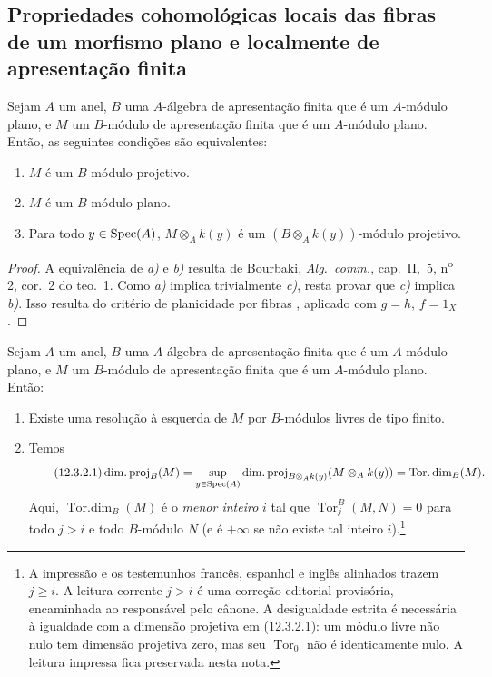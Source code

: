 \subsection{Propriedades cohomológicas locais das fibras de um morfismo plano e localmente de apresentação finita}
\label{subsection:IV.12.3}

\begin{lemma}[12.3.1]
\label{IV.12.3.1}
Sejam $A$ um anel, $B$ uma
$A$-álgebra de apresentação
finita que é um $A$-módulo
plano, e $M$ um $B$-módulo
de apresentação finita que
é um $A$-módulo plano.
Então, as seguintes condições
são equivalentes:
\begin{enumerate}[label=\emph{\alph*)}]
\item $M$ é um $B$-módulo
projetivo.
\item $M$ é um $B$-módulo
plano.
\item Para todo $y\in\operatorname{Spec}(A)$,
$M\otimes_A k(y)$ é um
$(B\otimes_A k(y))$-módulo
projetivo.
\end{enumerate}
\end{lemma}

\begin{proof}
A equivalência de \emph{a)}
e \emph{b)} resulta de
Bourbaki, \emph{Alg.\ comm.},
cap.~II, \textsection\,5,
n\textsuperscript{o}\,2,
cor.~2 do teo.~1.
Como \emph{a)} implica
trivialmente \emph{c)},
resta provar que \emph{c)}
implica \emph{b)}.
Isso resulta do critério
de planicidade por fibras
, aplicado
com $g=h$, $f=1_X$.
\end{proof}

\begin{proposition}[12.3.2]
\label{IV.12.3.2}
Sejam $A$ um anel, $B$ uma
$A$-álgebra de apresentação
finita que é um $A$-módulo
plano, e $M$ um $B$-módulo
de apresentação finita que
é um $A$-módulo plano.
Então:
\begin{enumerate}[label=(\roman*)]
\item Existe uma resolução
à esquerda de $M$ por
$B$-módulos livres de
tipo finito.
\item Temos
\begin{equation}
\tag{12.3.2.1}
\label{IV.12.3.2.1}
\operatorname{dim.proj}_B(M)
=\sup_{y\in\Spec(A)}
\operatorname{dim.proj}_{B\otimes_A k(y)}(M\otimes_A k(y))
=\operatorname{Tor.dim}_B(M).
\end{equation}
Aqui, $\operatorname{Tor.dim}_B(M)$
é o \emph{menor inteiro} $i$
tal que
$\operatorname{Tor}_j^B(M,N)=0$
para todo $j>i$ e todo
$B$-módulo $N$
(e é $+\infty$ se não
existe tal inteiro $i$).\footnote{A impressão
e os testemunhos francês, espanhol
e inglês alinhados trazem $j\geqslant i$.
A leitura corrente $j>i$ é uma
correção editorial provisória, encaminhada
ao responsável pelo cânone. A desigualdade
estrita é necessária à igualdade com a
dimensão projetiva em \textup{(12.3.2.1)}:
um módulo livre não nulo tem dimensão
projetiva zero, mas seu $\operatorname{Tor}_0$
não é identicamente nulo. A leitura
impressa fica preservada nesta nota.}
\end{enumerate}
\end{proposition}

